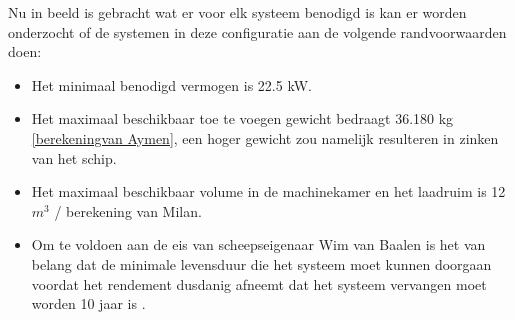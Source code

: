 \begin{table}[h]
\centering
\caption{Berekening Informatie specifieke energieopslag}
\label{tab:berekening_energieopslag}
\end{table}


Nu in beeld is gebracht wat er voor elk systeem benodigd is kan er worden onderzocht of de systemen in deze configuratie aan de volgende randvoorwaarden doen:

\begin{itemize}
    \item Het minimaal benodigd vermogen is 22.5 kW.
    \item Het maximaal beschikbaar toe te voegen gewicht bedraagt 36.180 kg \ref{berekeningvan Aymen}, een hoger gewicht zou namelijk resulteren in zinken van het schip.
    \item Het maximaal beschikbaar volume in de machinekamer en het laadruim is 12 $m^3$ \cite{vanbaalen2026interview}/ berekening van Milan.
    \item Om te voldoen aan de eis van scheepseigenaar Wim van Baalen is het van belang dat de minimale levensduur die het systeem moet kunnen doorgaan voordat het rendement dusdanig afneemt dat het systeem vervangen moet worden 10 jaar is \cite{vanbaalen2026interview}.
\end{itemize}


